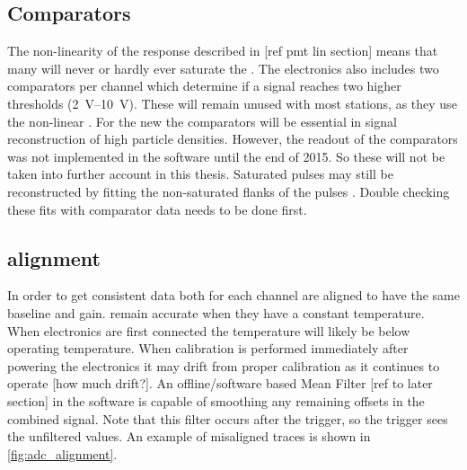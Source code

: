 \subsection{Comparators}

The non-linearity of the \pmt response described in [ref pmt lin section] means that many \pmts will never or hardly ever saturate the \adcs. The \hisparc electronics also includes two comparators per channel which determine if a signal reaches two higher thresholds (\SIrange{2}{10}{\volt}). These will remain unused with most stations, as they use the non-linear \pmts. For the new \pmts the comparators will be essential in signal reconstruction of high particle densities. However, the readout of the comparators was not implemented in the software until the end of 2015. So these will not be taken into further account in this thesis. Saturated pulses may still be reconstructed by fitting the non-saturated flanks of the pulses \cite[Section 3.5]{lio2011}. Double checking these fits with comparator data needs to be done first.


\subsection{\adc alignment}

In order to get consistent data both \adcs for each channel are aligned to have the same baseline and gain. \adcs remain accurate when they have a constant temperature. When \hisparc electronics are first connected the temperature will likely be below operating temperature. When calibration is performed immediately after powering the electronics it may drift from proper calibration as it continues to operate [how much drift?]. An offline/software based Mean Filter [ref to later section] in the software is capable of smoothing any remaining offsets in the combined signal. Note that this filter occurs after the trigger, so the trigger sees the unfiltered values. An example of misaligned traces is shown in \cref{fig:adc_alignment}.

